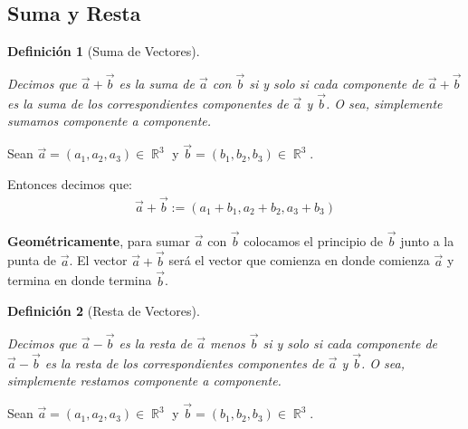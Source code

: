 \documentclass[12pt, fleqn]{report}                             %
\newtheorem{Definition}     {Definición}[section]               %
\theoremstyle{break}                                            %
\DeclareMathOperator \Reals        {\mathbb{R}}                 %
\begin{document}
            \subsection{Suma y Resta}
            
                \begin{Definition}[Suma de Vectores]
                    \label{DefSumaVectores}

                    Decimos que $\vec{a}+\vec{b}$ es la suma de $\vec{a}$ con $\vec{b}$ si y solo si 
                    cada componente de $\vec{a}+\vec{b}$ es la suma de los correspondientes componentes
                    de $\vec{a}$ y $\vec{b}$.
                    O sea, simplemente sumamos componente a componente.

                \end{Definition}

                Sean $\vec{a} = (a_1, a_2, a_3) \in \Reals^3$ y $\vec{b}=(b_1, b_2, b_3) \in \Reals^3$.

                Entonces decimos que:
                \begin{align}
                    \vec{a} + \vec{b} := (a_1 + b_1, a_2 + b_2, a_3 + b_3)
                \end{align}
            
                \textbf{Geométricamente}, para sumar $\vec{a}$ con $\vec{b}$ colocamos el principio de
                $\vec{b}$ junto a la punta de $\vec{a}$. El vector $\vec{a} + \vec{b}$ será el vector
                que comienza en donde comienza $\vec{a}$ y termina en donde termina $\vec{b}$.
                
                \vspace{2em}

                \begin{Definition}[Resta de Vectores]
                    \label{DefRestaVectores}

                    Decimos que $\vec{a}-\vec{b}$ es la resta de $\vec{a}$ menos $\vec{b}$ si y solo si 
                    cada componente de $\vec{a}-\vec{b}$ es la resta de los correspondientes componentes
                    de $\vec{a}$ y $\vec{b}$.
                    O sea, simplemente restamos componente a componente.
                    
                \end{Definition}

                Sean $\vec{a} = (a_1, a_2, a_3) \in \Reals^3$ y $\vec{b}=(b_1, b_2, b_3) \in \Reals^3$.
\end{document}
